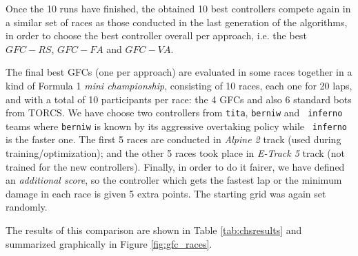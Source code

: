 \documentclass[conference]{IEEEtran}
\begin{document}
Once the 10 runs have finished, the obtained 10 best controllers compete again in a similar set of races as those conducted in the last generation of the algorithms, in order to choose the best controller overall per approach, i.e. the best $GFC-RS$, $GFC-FA$ and $GFC-VA$.



The final best GFCs (one per approach) are evaluated in some races together in a kind of Formula 1 {\em mini championship}, consisting of 10 races, each one for 20 laps, and with a total of 10 participants per race: the 4 GFCs and also 6 standard bots from TORCS. We have choose two controllers from {\tt tita}, {\tt berniw} and {\tt
	inferno} teams where {\tt berniw} is known by its aggressive overtaking policy while {\tt
	inferno} is the faster one.  The first 5 races are conducted in \textit{Alpine 2} track (used during training/optimization); and the other 5 races took place in \textit{E-Track 5} track (not trained for the new controllers). 
Finally, in order to do it fairer, we have defined an \textit{additional score}, so the controller which gets the fastest lap or the minimum damage in each race is given 5 extra points. The starting grid was again set randomly.

The results of this comparison are shown in Table \ref{tab:chsresults} and summarized graphically in Figure \ref{fig:gfc_races}. 
\end{document}
